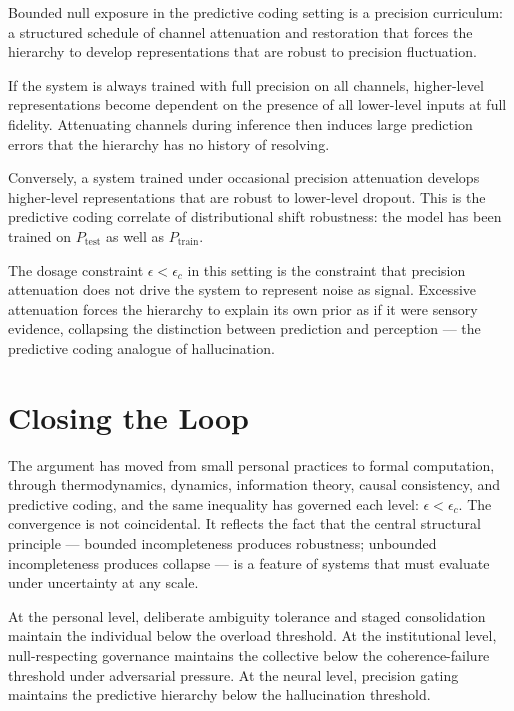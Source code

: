 \documentclass[11pt]{article}
\theoremstyle{remark}
\begin{document}
Bounded null exposure in the predictive coding setting is a precision curriculum: a structured schedule of channel attenuation and restoration that forces the hierarchy to develop representations that are robust to precision fluctuation.

If the system is always trained with full precision on all channels, higher-level representations become dependent on the presence of all lower-level inputs at full fidelity. Attenuating channels during inference then induces large prediction errors that the hierarchy has no history of resolving.

Conversely, a system trained under occasional precision attenuation develops higher-level representations that are robust to lower-level dropout. This is the predictive coding correlate of distributional shift robustness: the model has been trained on $P_{\text{test}}$ as well as $P_{\text{train}}$.

The dosage constraint $\epsilon < \epsilon_c$ in this setting is the constraint that precision attenuation does not drive the system to represent noise as signal. Excessive attenuation forces the hierarchy to explain its own prior as if it were sensory evidence, collapsing the distinction between prediction and perception --- the predictive coding analogue of hallucination.

\section{Closing the Loop}
\label{sec:closing}

The argument has moved from small personal practices to formal computation, through thermodynamics, dynamics, information theory, causal consistency, and predictive coding, and the same inequality has governed each level: $\epsilon < \epsilon_c$. The convergence is not coincidental. It reflects the fact that the central structural principle --- bounded incompleteness produces robustness; unbounded incompleteness produces collapse --- is a feature of systems that must evaluate under uncertainty at any scale.

At the personal level, deliberate ambiguity tolerance and staged consolidation maintain the individual below the overload threshold. At the institutional level, null-respecting governance maintains the collective below the coherence-failure threshold under adversarial pressure. At the neural level, precision gating maintains the predictive hierarchy below the hallucination threshold.
\end{document}
